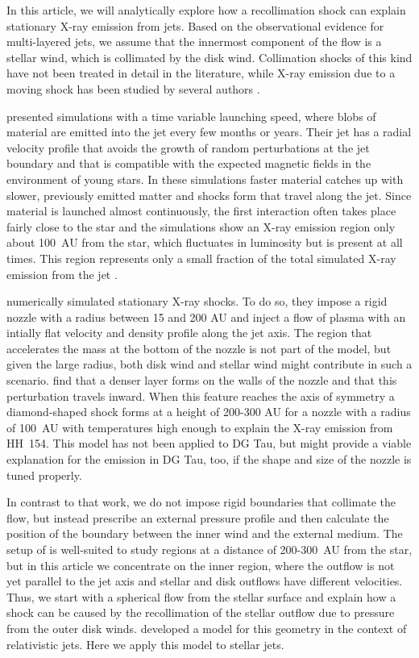 In this article, we will analytically explore how a recollimation shock can explain stationary X-ray emission from jets. Based on the observational evidence for multi-layered jets, we assume that the innermost component of the flow is a stellar wind, which is collimated by the disk wind. Collimation shocks of this kind have not been treated in detail in the literature, while X-ray emission due to a moving shock has been studied by several authors \citep[see, e.g.\ the analytical work and numerical simulations by][]{2002ApJ...576L.149R,2007A&A...462..645B}.

\citet{2010A&A...511A..42B} presented simulations with a time variable launching speed, where blobs of material are emitted into the jet every few months or years. Their jet has a radial velocity profile that avoids the growth of random perturbations at the jet boundary and that is compatible with the expected magnetic fields in the environment of young stars. In these simulations faster material catches up with slower, previously emitted matter and shocks form that travel along the jet. Since material is launched almost continuously, the first interaction often takes place fairly close to the star and the simulations show an X-ray emission region only about 100~AU from the star, which fluctuates in luminosity but is present at all times. This region represents only a small fraction of the total simulated X-ray emission from the jet \citep{2010A&A...517A..68B}.

\citet{2011ApJ...737...54B} numerically simulated stationary X-ray shocks. To do so, they impose a rigid nozzle with a radius between 15 and 200 AU and inject a flow of plasma with an intially flat velocity and density profile along the jet axis. The region that accelerates the mass at the bottom of the nozzle is not part of the model, but given the large radius, both disk wind and stellar wind might contribute in such a scenario. \citet{2011ApJ...737...54B} find that a denser layer forms on the walls of the nozzle and that this perturbation travels inward. When this feature reaches the axis of symmetry a diamond-shaped shock forms at a height of 200-300 AU for a nozzle with a radius of 100~AU with temperatures high enough to explain the X-ray emission from HH~154. This model has not been applied to DG Tau, but might provide a viable explanation for the emission in DG Tau, too, if the shape and size of the nozzle is tuned properly.

In contrast to that work, we do not impose rigid boundaries that collimate the flow, but instead prescribe an external pressure profile and then calculate the position of the boundary between the inner wind and the external medium. The setup of \citet{2011ApJ...737...54B} is well-suited to study regions at a distance of 200-300~AU from the star, but in this article we concentrate on the inner region, where the outflow is not yet parallel to the jet axis and stellar and disk outflows have different velocities. Thus, we start with a spherical flow from the stellar surface and explain how a shock can be caused by the recollimation of the stellar outflow due to pressure from the outer disk winds. 
\citet{2012MNRAS.422.2282K} developed a model for this geometry in the context of relativistic jets. Here we apply this model to stellar jets.